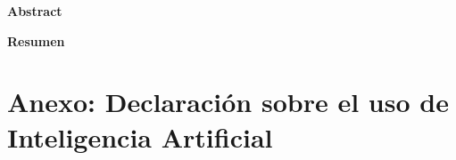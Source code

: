 \documentclass[11pt,oneside]{thesis}
\begin{document}
\hypersetup{pageanchor=false}
\maketitle
\frontmatter
\hypersetup{pageanchor=true}
\makeapprovalletter
\makecommitmentletter

\clearpage
\begin{center}{\bfseries Abstract}\end{center}

\clearpage
\begin{center}{\bfseries Resumen}\end{center}

\tableofcontents
\listoftables
\listoffigures

\mainmatter










\clearpage
{}
\chapter*{Anexo: Declaración sobre el uso de Inteligencia Artificial}
\markboth{}{}




\end{document}
